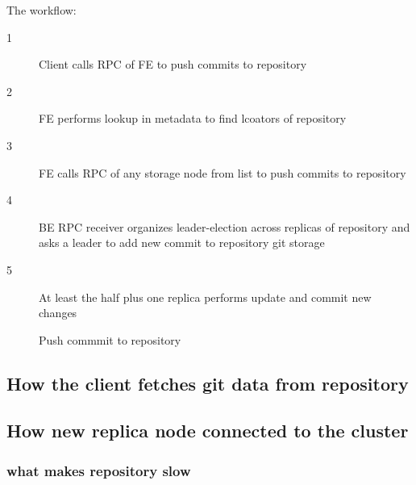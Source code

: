 The workflow:
\begin{description}
  \item[1] Client calls RPC of FE to push commits  to repository 
  \item[2] FE performs lookup in metadata to find lcoators  of repository 
  \item[3] FE calls RPC of any storage node from  list to push commits  to
    repository 
  \item[4] BE RPC receiver organizes leader-election across replicas of repository 
    and asks a leader to add new commit  to repository git storage
  \item[5] At least the half plus one replica performs update and commit new changes
\end{description}

\begin{figure}
  \begin{center}
  \end{center}
  \caption{Push commmit  to repository }
\label{fig:ex-push-to-repo}
\end{figure}

\subsection{How the client fetches git data from repository}

\subsection{How new replica node connected to the cluster}



\subsubsection{what makes repository slow}

\todo{}
